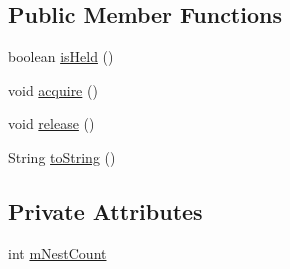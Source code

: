\subsection*{Public Member Functions}
\begin{DoxyCompactItemize}
\item 
boolean \hyperlink{classcom_1_1android_1_1server_1_1power_1_1PowerManagerService_1_1ScreenOnBlockerImpl_a7e1b43afda3f112372d60d478786d3e5}{is\-Held} ()
\item 
void \hyperlink{classcom_1_1android_1_1server_1_1power_1_1PowerManagerService_1_1ScreenOnBlockerImpl_affc3f35130d2c7167f393c691409db6a}{acquire} ()
\item 
void \hyperlink{classcom_1_1android_1_1server_1_1power_1_1PowerManagerService_1_1ScreenOnBlockerImpl_adf64fc369d1a3e982576220b723471a3}{release} ()
\item 
String \hyperlink{classcom_1_1android_1_1server_1_1power_1_1PowerManagerService_1_1ScreenOnBlockerImpl_a9817d8e0a2cfaaa5c4236a5801d09a29}{to\-String} ()
\end{DoxyCompactItemize}
\subsection*{Private Attributes}
\begin{DoxyCompactItemize}
\item 
int \hyperlink{classcom_1_1android_1_1server_1_1power_1_1PowerManagerService_1_1ScreenOnBlockerImpl_af669f3b619d62089ad8103182b92c99f}{m\-Nest\-Count}
\end{DoxyCompactItemize}



